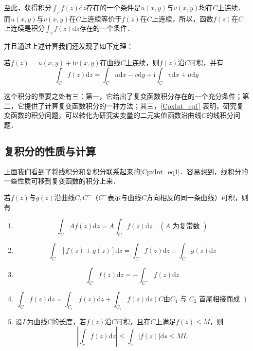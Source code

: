 至此，获得积分$\displaystyle \int_{c} f(z) \mathrm{d} z$存在的一个条件是$u(x, y)$与$v(x, y)$均在$C$上连续．而$u(x, y)$与$v(x, y)$在$C$上连续等价于$ f (z)$在$C$上连续，所以，函数$ f (z)$在$C$上连续是积分$\displaystyle \int_{c} f(z) \mathrm{d} z$存在的一个条件．

并且通过上述计算我们还发现了如下定理：
\begin{theorem}{} 
若$ f (z) = u(x, y) + \mathrm iv(x, y)$在曲线$C$上连续，则$f (z)$沿$C$可积，并有
\begin{equation} \label{CpxInt_eq1}
\int_{C} f(z) \mathrm{d} z=\int_{C} u \mathrm{d} x-v \mathrm{d} y+\mathrm{i} \int_{C} v \mathrm{d} x+u \mathrm{d} y
\end{equation}
\end{theorem}

这个积分的重要之处有三：第一，它给出了复变函数积分存在的一个充分条件；第二，它提供了计算复变函数积分的一种方法；其三，\autoref{CpxInt_eq1} 表明，研究复变函数的积分问题，可以转化为研究实变量的二元实值函数沿曲线$C $的线积分问题．

\subsection{复积分的性质与计算}

上面我们看到了将线积分和复积分联系起来的\autoref{CpxInt_eq1}．容易想到，线积分的一些性质可移到复变函数的积分上来．

若$ f (z)$与$g (z)$沿曲线$C,C^-$（$C^-$表示与曲线$C$方向相反的同一条曲线）可积，则有
\begin{enumerate}
\item \begin{equation}
\int_{C} A f(z) \mathrm{d} z=A \int_{C} f(z) \mathrm{d} z \quad(A \text { 为复常数 })
\end{equation}
\item \begin{equation}
\int_{C}[f(z) \pm g(z)] \mathrm{d} z=\int_{C} f(z) \mathrm{d} z \pm \int_{C} g(z) \mathrm{d} z
\end{equation}
\item \begin{equation} 
\int_{C} f(z) \mathrm{d} z=-\int_{C^{-}} f(z) \mathrm{d} z
\end{equation}
\item \begin{equation}
\int_{C} f(z) \mathrm{d} z=\int_{C_{1}} f(z) \mathrm{d} z+\int_{C_{2}} f(z) \mathrm{d} z\left(C\text{由} C_{1} \text { 与 } C_{2} \text { 首尾相接而成 }\right)
\end{equation}
\item 设$ L$为曲线$C$的长度，若$ f (z)$沿$C$可积，且在$C$上满足$ f (z) \leqslant M $，则
\begin{equation} \label{CpxInt_eq2}
\left|\int_{c} f(z) \mathrm{d} z\right| \leqslant \int_{c}|f(z)| \mathrm{d} s \leqslant M L
\end{equation}
\end{enumerate}

